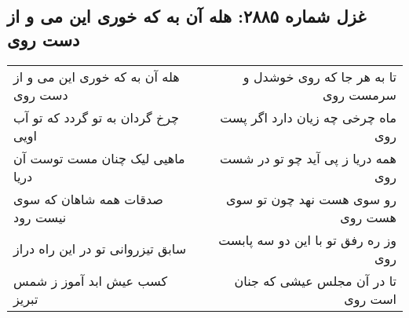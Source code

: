 \begin{center}
\section*{غزل شماره ۲۸۸۵: هله آن به که خوری این می و از دست روی}
\label{sec:2885}
\begin{longtable}{l p{0.5cm} r}
هله آن به که خوری این می و از دست روی
&&
تا به هر جا که روی خوشدل و سرمست روی
\\
چرخ گردان به تو گردد که تو آب اویی
&&
ماه چرخی چه زیان دارد اگر پست روی
\\
ماهیی لیک چنان مست توست آن دریا
&&
همه دریا ز پی آید چو تو در شست روی
\\
صدقات همه شاهان که سوی نیست رود
&&
رو سوی هست نهد چون تو سوی هست روی
\\
سابق تیزروانی تو در این راه دراز
&&
وز ره رفق تو با این دو سه پابست روی
\\
کسب عیش ابد آموز ز شمس تبریز
&&
تا در آن مجلس عیشی که جنان است روی
\\
\end{longtable}
\end{center}
